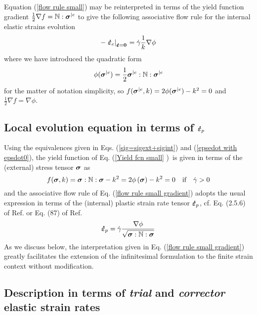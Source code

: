 \documentclass[preprint,review,12pt,sort&compress]{elsarticle}%
\newcommand{\epsdo}[0]{\scriptsize\mathbf{\dot \varepsilon} = \mathbf{0}\normalsize\mathbf{}}
\renewcommand{\mathbf}[1]{\mbox{\boldmath $#1$ \unboldmath}  \!\!}
\begin{document}
Equation (\ref{flow rule small}) may be reinterpreted in terms of the yield
function gradient $\frac{1}{2}\nabla f=\mathbb{N}:\mathbf{\sigma}^{|e}$ to
give the following associative flow rule for the internal elastic strains
evolution%
\begin{equation}
-\left.  \mathbf{\dot{\varepsilon}}_{e}\right\vert _{%
\epsdo
}=\dot{\gamma}\frac{1}{k}\nabla\phi\label{flow rule small gradient}%
\end{equation}
where we have introduced the quadratic form
\begin{equation}
\phi(\mathbf{\sigma}^{|e})=\frac{1}{2}\mathbf{\sigma}^{|e}:\mathbb{N}%
:\mathbf{\sigma}^{|e} \label{phi pequenas}%
\end{equation}
for the matter of notation simplicity, so $f(\mathbf{\sigma}^{|e}%
,k)=2\phi(\mathbf{\sigma}^{|e})-k^{2}=0$ and $\frac{1}{2}\nabla f=\nabla\phi$.

\subsection{Local evolution equation in terms of $\mathbf{\dot{\varepsilon}%
}_{p}$}

Using the equivalences given in Eqs. (\ref{sig=sigext+sigint}) and
(\ref{epsedot with epsdot0}), the yield function of Eq. (\ref{Yield fcn small}%
)\ is given in terms of the (external) stress tensor $\mathbf{\sigma}$ as%
\begin{equation}
f(\mathbf{\sigma},k)=\mathbf{\sigma}:\mathbb{N}:\mathbf{\sigma}-k^{2}%
=2\phi\left(  \mathbf{\sigma}\right)  -k^{2}=0\text{\quad if}\quad\dot{\gamma
}>0
\end{equation}
and the associative flow rule of Eq. (\ref{flow rule small gradient}) adopts
the usual expression in terms of the (internal) plastic strain rate tensor
$\mathbf{\dot{\varepsilon}}_{p}$, cf. Eq. (2.5.6) of Ref.
\cite{SimoHughesBook} or Eq. (87) of Ref. \cite{MinCamMon}%
\begin{equation}
\mathbf{\dot{\varepsilon}}_{p}=\dot{\gamma}\frac{\nabla\phi}{\sqrt
{\mathbf{\sigma}:\mathbb{N}:\mathbf{\sigma}}} \label{flow rule small plastic}%
\end{equation}
As we discuss below, the interpretation given in Eq.
(\ref{flow rule small gradient}) greatly facilitates the extension of the
infinitesimal formulation to the finite strain context without modification.

\subsection{Description in terms of \emph{trial} and \emph{corrector} elastic
strain rates}
\end{document}
